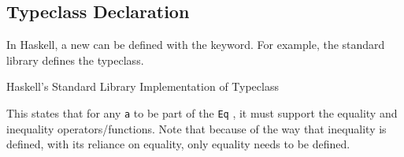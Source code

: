 \subsection{Typeclass Declaration}\label{subsec:Typeclass_Declaration}
In Haskell, a new  can be defined with the  keyword.
For example, the standard library defines the  typeclass.

\begin{listing}[h!tbp]
\caption{Haskell's Standard Library Implementation of  Typeclass}
\label{lst:Eq_Typeclass_Definition}
\end{listing}

This states that for any  \texttt{a} to be part of the \texttt{Eq} , it must support the equality and inequality operators/functions.
Note that because of the way that inequality is defined, with its reliance on equality, only equality needs to be defined.

